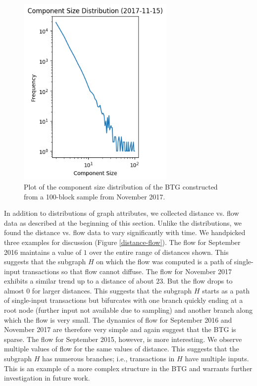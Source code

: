 \documentclass[letterpaper, 10 pt, conference]{ieeeconf}  %
\begin{document}
\begin{figure}
\centering
\includegraphics[width=3in]{Plots/Comp_distros/2017-11-15.png}
\caption{\label{comp-distro} Plot of the component size distribution of the BTG constructed from a 100-block sample from November 2017.}
\end{figure}

In addition to distributions of graph attributes, we collected distance vs. flow data as described at the beginning of this section. Unlike the distributions, we found the distance vs. flow data to vary significantly with time. We handpicked three examples for discussion (Figure \ref{distance-flow}). The flow for September 2016 maintains a value of $1$ over the entire range of distances shown. This suggests that the subgraph $H$ on which the flow was computed is a path of single-input transactions so that flow cannot diffuse. The flow for November 2017 exhibits a similar trend up to a distance of about $23$. But the flow drops to almost $0$ for larger distances. This suggests that the subgraph $H$ starts as a path of single-input transactions but bifurcates with one branch quickly ending at a root node (further input not available due to sampling) and another branch along which the flow is very small. The dynamics of flow for September 2016 and November 2017 are therefore very simple and again suggest that the BTG is sparse. The flow for September 2015, however, is more interesting. We observe multiple values of flow for the same values of distance. This suggests that the subgraph $H$ has numerous branches; i.e., transactions in $H$ have multiple inputs. This is an example of a more complex structure in the BTG and warrants further investigation in future work.
\end{document}
